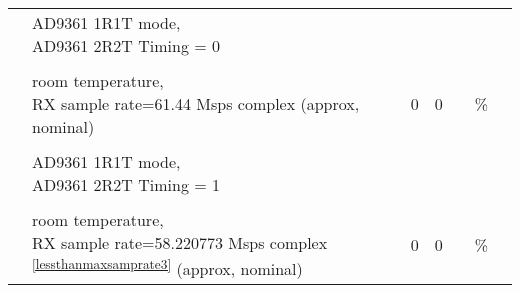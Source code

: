 \documentclass{article}
\begin{document}
\begin{scriptsize}
\begin{longtable}{|c|l|c|c|c|c|l|}
                          & \multirow{2}{*}{\parbox{9.5 cm}{\hspace*{12mm}AD9361 1R1T mode, \\ \hspace*{12mm}AD9361 2R2T Timing = 0}} & & & & & \\
                          &                                      &                                & &                                &                      & \\
                          &                                      &                                & &                                &                      & \\
                          & \multirow{2}{*}{\parbox{9.5cm}{\hspace*{15mm}room temperature, \\ \hspace*{15mm}RX sample rate=61.44 Msps complex (approx, nominal)}} & \multirow{2}{*}{0} & \multirow{2}{*}{0} & & \multirow{2}{*}{\%} & \\
                          &                                      &                                & &                                &                      & \\
                          &                                      &                                & &                                &                      & \\
                          & \multirow{2}{*}{\parbox{9.5 cm}{\hspace*{12mm}AD9361 1R1T mode, \\ \hspace*{12mm}AD9361 2R2T Timing = 1}} & & & & & \\
                          &                                      &                                & &                                &                      & \\
                          &                                      &                                & &                                &                      & \\
                          & \multirow{2}{*}{\parbox{9.5cm}{\hspace*{15mm}room temperature, \\ \hspace*{15mm}RX sample rate=58.220773 Msps complex \textsuperscript{\ref{lessthanmaxsamprate3}} (approx, nominal)}} & \multirow{2}{*}{0} & \multirow{2}{*}{0} & & \multirow{2}{*}{\%} & \multirow{2}{*}{} \\

\end{longtable}
\end{scriptsize}
\end{document}

